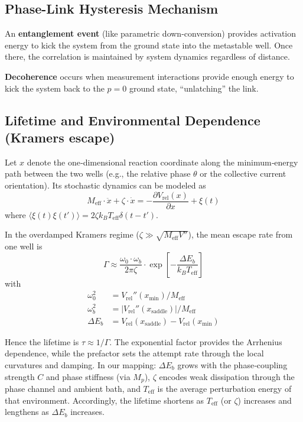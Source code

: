 \documentclass[11pt]{article}
\begin{document}
\subsection{Phase-Link Hysteresis Mechanism}

An \textbf{entanglement event} (like parametric down-conversion) provides activation energy to kick the system from the ground state into the metastable well. Once there, the correlation is maintained by system dynamics regardless of distance.

\textbf{Decoherence} occurs when measurement interactions provide enough energy to kick the system back to the $p = 0$ ground state, ``unlatching'' the link.

\subsection{Lifetime and Environmental Dependence (Kramers escape)}

Let $x$ denote the one‑dimensional reaction coordinate along the minimum‑energy path between the two wells (e.g., the relative phase $\theta$ or the collective current orientation). Its stochastic dynamics can be modeled as
\begin{equation}
M_{\text{eff}} \cdot \ddot{x} + \zeta \cdot \dot{x} = - \frac{\partial V_{\text{rel}}(x)}{\partial x} + \xi(t)
\end{equation}
where $\langle\xi(t) \xi(t')\rangle = 2 \zeta k_B T_{\text{eff}} \delta(t-t')$.

In the overdamped Kramers regime ($\zeta \gg \sqrt{M_{\text{eff}} V''}$), the mean escape rate from one well is
\begin{equation}
\Gamma \approx \frac{\omega_0 \cdot \omega_b}{2\pi \zeta} \cdot \exp\left[ - \frac{\Delta E_b}{k_B T_{\text{eff}}} \right]
\end{equation}
with
\begin{align}
\omega_0^2 &= V_{\text{rel}}''(x_{\text{min}})/M_{\text{eff}}\\
\omega_b^2 &= |V_{\text{rel}}''(x_{\text{saddle}})|/M_{\text{eff}}\\
\Delta E_b &= V_{\text{rel}}(x_{\text{saddle}}) - V_{\text{rel}}(x_{\text{min}})
\end{align}

Hence the lifetime is $\tau \approx 1/\Gamma$. The exponential factor provides the Arrhenius dependence, while the prefactor sets the attempt rate through the local curvatures and damping. In our mapping: $\Delta E_b$ grows with the phase‑coupling strength $C$ and phase stiffness (via $M_p$), $\zeta$ encodes weak dissipation through the phase channel and ambient bath, and $T_{\text{eff}}$ is the average perturbation energy of that environment. Accordingly, the lifetime shortens as $T_{\text{eff}}$ (or $\zeta$) increases and lengthens as $\Delta E_b$ increases.
\end{document}
